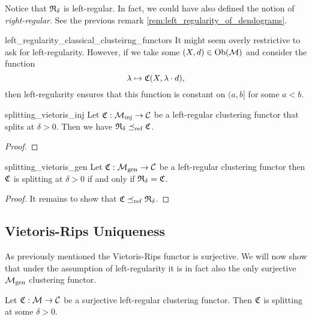 Notice that $\mathfrak{R}_\delta$ is left-regular. In fact, we could have also defined the notion of \emph{right-regular}. See the previous remark \ref{rem:left_regularity_of_dendograms}.\par

\begin{myremark}{}{left_regularity_classical_clusteirng_functors}
    \medskip It might seem overly restrictive to ask for left-regularity.
    However, if we take some $(X, d) \in \mathrm {Ob}(\mathcal{M})$ and consider the function 
    $$
    \lambda \mapsto \mathfrak{C}(X, \lambda \cdot d),
    $$
    then left-regularity ensures that this function is constant on $(a, b]$ for some $a < b$.

\end{myremark}



\begin{proposition}{}{splitting_vietoris_inj}
    Let $\mathfrak{C}: {\mathcal{M}_\mathrm{inj}} \to \mathcal{C}$ be a left-regular clustering functor that splits at $\delta > 0$. Then we have $\mathfrak{R}_\delta \preceq_\mathrm{ref} \mathfrak{C}$.

\end{proposition}

\begin{proof}
    \todo[]
\end{proof}

\begin{proposition}{}{splitting_vietoris_gen}
    Let $\mathfrak{C}: {\mathcal{M}_\mathrm{gen}} \to \mathcal{C}$ be a left-regular clustering functor then $\mathfrak{C}$ is splitting at $\delta > 0$ if and only if $\mathfrak{R}_\delta = \mathfrak{C}$.

\end{proposition}

\begin{proof}
    It remains to show that $\mathfrak{C} \preceq_\mathrm{ref} \mathfrak{R}_\delta$.

    \todo[]
\end{proof}

\subsection{Vietoris-Rips Uniqueness}

As previously mentioned the Vietoris-Rips functor is surjective. We will now show that under the assumption of left-regularity it is in fact also the only surjective ${\mathcal{M}_\mathrm{gen}}$ clustering functor.

\begin{lemma}{}{}
    Let $\mathfrak{C}: \mathcal{M} \to \mathcal{C}$ be a surjective left-regular clustering functor. Then $\mathfrak{C}$ is splitting at some $\delta > 0$.

\end{lemma}

